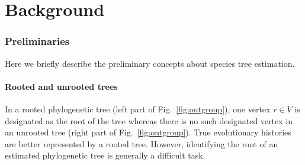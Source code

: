 \chapter{Background}
\label{background}

\graphicspath{{cybernatics/supp/}}
 

\graphicspath{{snoga/}}
\subsection{Preliminaries}
Here we briefly describe the preliminary concepts about species tree estimation. 

\subsubsection{Rooted and unrooted trees} 
In a rooted phylogenetic tree (left part of Fig.~\ref{fig:outgroup}), one vertex $r \in V$ is designated as the root of the tree whereas there is no such designated vertex in an unrooted tree (right part of Fig.~\ref{fig:outgroup}). True evolutionary histories are better represented by a rooted tree. However, identifying the root of an estimated phylogenetic tree is generally a difficult task.

